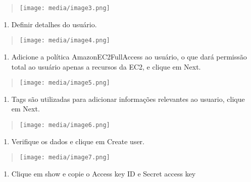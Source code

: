 \begin{quote}
\texttt{[image: media/image3.png]}
\end{quote}

\begin{enumerate}
\def\labelenumi{\arabic{enumi}.}
\setcounter{enumi}{2}
\item
  Definir detalhes do usuário.
\end{enumerate}

\begin{quote}
\texttt{[image: media/image4.png]}
\end{quote}

\begin{enumerate}
\def\labelenumi{\arabic{enumi}.}
\setcounter{enumi}{3}
\item
  Adicione a política AmazonEC2FullAccess ao usuário, o que dará
  permissão total ao usuário apenas a recursos da EC2, e clique em Next.
\end{enumerate}

\begin{quote}
\texttt{[image: media/image5.png]}
\end{quote}

\begin{enumerate}
\def\labelenumi{\arabic{enumi}.}
\setcounter{enumi}{4}
\item
  Tags são utilizadas para adicionar informações relevantes ao usuario,
  clique em Next.
\end{enumerate}

\begin{quote}
\texttt{[image: media/image6.png]}
\end{quote}

\begin{enumerate}
\def\labelenumi{\arabic{enumi}.}
\setcounter{enumi}{5}
\item
  Verifique os dados e clique em Create user.
\end{enumerate}

\begin{quote}
\texttt{[image: media/image7.png]}
\end{quote}

\begin{enumerate}
\def\labelenumi{\arabic{enumi}.}
\setcounter{enumi}{6}
\item
  Clique em show e copie o Access key ID e Secret access key
\end{enumerate}

